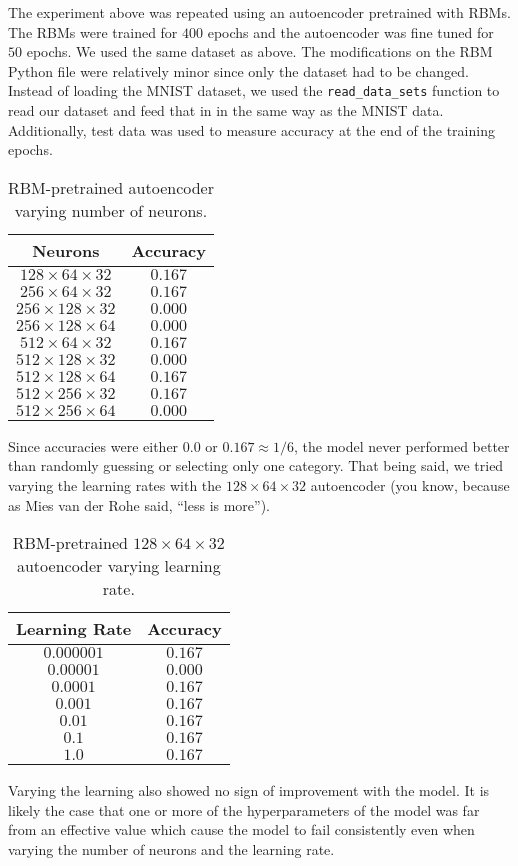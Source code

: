 \documentclass[a4paper]{article}
\begin{document}
The experiment above was repeated using an autoencoder pretrained with RBMs.
The RBMs were trained for $400$ epochs and the autoencoder was fine tuned for
$50$ epochs.
We used the same dataset as above.
The modifications on the RBM Python file were relatively minor since only the
dataset had to be changed. Instead of loading the MNIST dataset, we used the
\texttt{read\_data\_sets} function to read our dataset and feed that in in the
same way as the MNIST data. Additionally, test data was used to measure accuracy
at the end of the training epochs.


\begin{table}[h]
 \caption{RBM-pretrained autoencoder varying number of neurons.}
 \label{table}
 \begin{center}
  \begin{tabular}{c|c}
    \hline \hline
    Neurons & Accuracy \\
    \hline
    $128\times64\times32$  & $0.167$ \\
    $256\times64\times32$  & $0.167$ \\
    $256\times128\times32$ & $0.000$ \\
    $256\times128\times64$ & $0.000$ \\
    $512\times64\times32$  & $0.167$ \\
    $512\times128\times32$ & $0.000$ \\
    $512\times128\times64$ & $0.167$ \\
    $512\times256\times32$ & $0.167$ \\
    $512\times256\times64$ & $0.000$
  \end{tabular}
 \end{center}
\end{table}

Since accuracies were either $0.0$ or $0.167 \approx 1/6$, the model never
performed better than randomly guessing or selecting only one category.
That being said, we tried varying the learning rates with the
$128\times64\times32$ autoencoder
(you know, because as Mies van der Rohe said, ``less is more'').

\begin{table}[h]
 \caption{RBM-pretrained $128\times64\times32$ autoencoder varying
 learning rate.}
 \label{table}
 \begin{center}
  \begin{tabular}{c|c}
    \hline \hline
    Learning Rate & Accuracy \\
    \hline
    $0.000001$ & $0.167$ \\
    $0.00001$ & $0.000$ \\
    $0.0001$ & $0.167$ \\
    $0.001$ & $0.167$ \\
    $0.01$ & $0.167$ \\
    $0.1$ & $0.167$ \\
    $1.0$ & $0.167$
  \end{tabular}
 \end{center}
\end{table}

Varying the learning also showed no sign of improvement with the model.
It is likely the case that one or more of the hyperparameters of the model
was far from an effective value which cause the model to fail consistently even when
varying the number of neurons and the learning rate.
\end{document}
